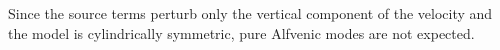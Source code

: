 \documentclass[linenumbers]{aastex63}
\begin{document}
  Since the source terms perturb only the vertical component of the velocity and the model is cylindrically symmetric, pure Alfvenic modes are not expected. 









\end{document}
